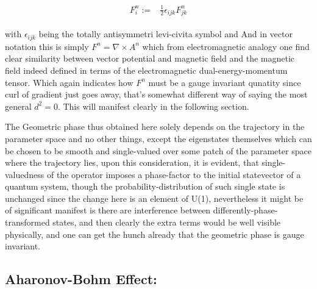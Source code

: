 \documentclass[8pt, twocoloumn]{article}
\begin{document}
\begin{align}
\begin{split}
F^n_i :={}& \frac{1}{2} \epsilon_{ijk}F^n_{jk}
\end{split}
\end{align} 

with $\epsilon_{ijk}$ being the totally antisymmetri levi-civita symbol and And in vector notation this is simply $F^n = \nabla \times A^n$ which from electromagnetic analogy one find clear similarity between vector potential and magnetic field and the magnetic field indeed defined in terms of the electromagnetic dual-energy-momentum tensor. Which again indicates how $F^n$ must be a gauge invariant qunatity since curl of gradient just goes away, that's somewhat different way of saying the most general $d^2=0$. This will manifest clearly in the following section.

The Geometric phase thus obtained here solely depends on the trajectory in the parameter space and no other things, except the eigenstates themselves which can be chosen to be smooth and single-valued over some patch of the parameter space where the trajectory lies, upon this consideration, it is evident, that single-valuedness of the operator imposes a phase-factor to the initial statevector of a quantum system, though the probability-distribution of such single state is unchanged since the change here is an element of U(1), nevertheless it might be of significant manifest is there are interference between differently-phase-transformed states, and then clearly the extra terms would be well visible physically, and one can get the hunch already that the geometric phase is gauge invariant.
 

\subsection{Aharonov-Bohm Effect: }
\end{document}
